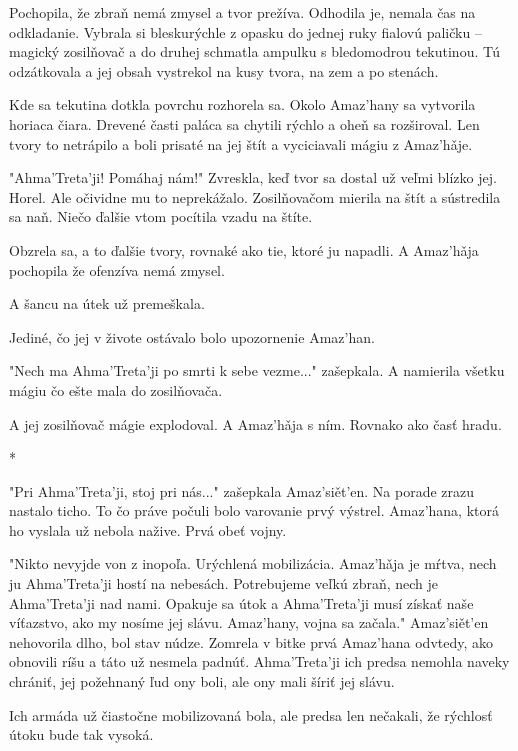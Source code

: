 \documentclass{book}
\begin{document}
Pochopila, že zbraň nemá zmysel a tvor prežíva. Odhodila je, nemala čas na odkladanie. Vybrala si bleskurýchle z opasku do jednej ruky fialovú paličku – magický zosilňovač a do druhej schmatla ampulku s bledomodrou tekutinou. Tú odzátkovala a jej obsah vystrekol na kusy tvora, na zem a po stenách.

Kde sa tekutina dotkla povrchu rozhorela sa. Okolo Amaz'hany sa vytvorila horiaca čiara. Drevené časti paláca sa chytili rýchlo a oheň sa rozširoval. Len tvory to netrápilo a boli prisaté na jej štít a vyciciavali mágiu z Amaz'ha\v{}je.

"$ $Ahma'Treta'ji! Pomáhaj nám!"$ $ Zvreskla, keď tvor sa dostal už veľmi blízko jej. Horel. Ale očividne mu to neprekážalo. Zosilňovačom mierila na štít a sústredila sa naň. Niečo ďalšie vtom pocítila vzadu na štíte.

Obzrela sa, a to ďalšie tvory, rovnaké ako tie, ktoré ju napadli. A Amaz'ha\v{}ja pochopila že ofenzíva nemá zmysel.

A šancu na útek už premeškala.

Jediné, čo jej v živote ostávalo bolo upozornenie Amaz'han.

"$ $Nech ma Ahma'Treta'ji po smrti k sebe vezme..."$ $ zašepkala. A namierila všetku mágiu čo ešte mala do zosilňovača.

A jej zosilňovač mágie explodoval. A Amaz'ha\v{}ja s ním. Rovnako ako časť hradu.

\begin{center}
*
\end{center}

"$ $Pri Ahma'Treta'ji, stoj pri nás..."$ $ zašepkala Amaz'sie\v{}t'en. Na porade zrazu nastalo ticho. To čo práve počuli bolo varovanie prvý výstrel. Amaz'hana, ktorá ho vyslala už nebola nažive. Prvá obeť vojny.

"$ $Nikto nevyjde von z inopoľa. Urýchlená mobilizácia. Amaz'ha\v{}ja je mŕtva, nech ju Ahma'Treta'ji hostí na nebesách. Potrebujeme veľkú zbraň, nech je Ahma'Treta'ji nad nami. Opakuje sa útok a Ahma'Treta'ji musí získať naše víťazstvo, ako my nosíme jej slávu. Amaz'hany, vojna sa začala."$ $ Amaz'sie\v{}t'en nehovorila dlho, bol stav núdze. Zomrela v bitke prvá Amaz'hana odvtedy, ako obnovili ríšu a táto už nesmela padnúť. Ahma'Treta'ji ich predsa nemohla naveky chrániť, jej požehnaný ľud ony boli, ale ony mali šíriť jej slávu.

Ich armáda už čiastočne mobilizovaná bola, ale predsa len nečakali, že rýchlosť útoku bude tak vysoká.
\end{document}
